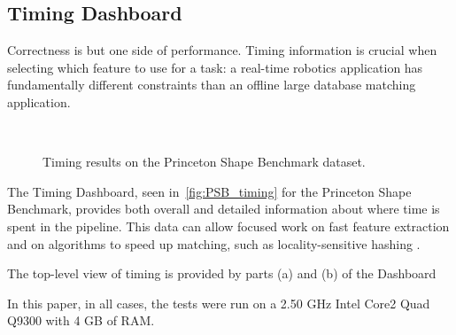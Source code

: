 \subsection{Timing Dashboard}

Correctness is but one side of performance.
Timing information is crucial when selecting which feature to use for a task: a real-time robotics application has fundamentally different constraints than an offline large database matching application.

\begin{figure}[thpb]
\centering
{} \\
\vspace{1em}
\caption{Timing results on the Princeton Shape Benchmark dataset.}
\label{fig:PSB_timing}
\end{figure}

The Timing Dashboard, seen in~\autoref{fig:PSB_timing} for the Princeton Shape Benchmark, provides both overall and detailed information about where time is spent in the pipeline.
This data can allow focused work on fast feature extraction and on algorithms to speed up matching, such as locality-sensitive hashing \cite{Frome2004}.

The top-level view of timing is provided by parts (a) and (b) of the Dashboard

In this paper, in all cases, the tests were run on a 2.50 GHz Intel Core2 Quad Q9300 with 4 GB of RAM.

